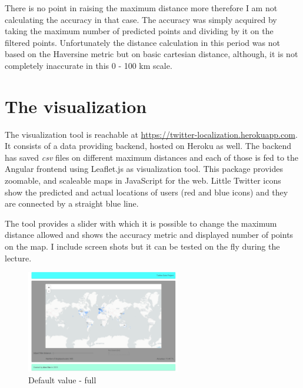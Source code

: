 \documentclass[a4paper,12pt]{article}
\begin{document}
\par There is no point in raising the maximum distance more therefore I am
not calculating the accuracy in that case. The accuracy was simply acquired by
taking the maximum number of predicted points and dividing by it on the filtered points.
Unfortunately the distance calculation in this period was not based on the Haversine metric but
on basic cartesian distance, although, it is not completely inaccurate in this 0 - 100 km scale.

\section{The visualization}

\par The visualization tool is reachable at \url{https://twitter-localization.herokuapp.com}. It consists 
of a data providing backend, hosted on Heroku as well. The backend has saved \textit{csv}
files on different maximum distances and each of those is fed to the Angular 
frontend using Leaflet.js \cite{leaflet} as visualization tool. This package provides zoomable, and 
scaleable maps in JavaScript for the web. Little Twitter icons show the predicted
and actual locations of users (red and blue icons) and they are connected by a straight blue
line.

\vspace{.2cm}

\par The tool provides a slider with which it is possible to change the maximum
distance allowed and shows the accuracy metric and displayed number of points on the
map. I include screen shots but it can be tested on the fly during the lecture.

\vspace{.2cm}

\begin{figure}[H]
	\centering
	\includegraphics[width=0.6\textwidth, height=0.35\textwidth]{./twitter1.png}
	\caption{Default value - full}
\end{figure}
\end{document}
